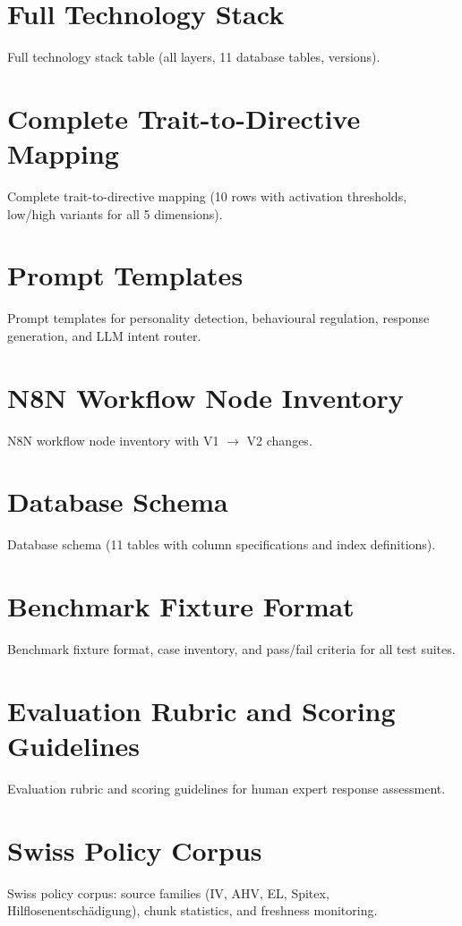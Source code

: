 \documentclass[10pt,a4paper]{report}
\begin{document}



\appendix
\chapter{Full Technology Stack}
Full technology stack table (all layers, 11 database tables, versions).

\chapter{Complete Trait-to-Directive Mapping}
Complete trait-to-directive mapping (10 rows with activation thresholds, low/high variants for all 5 dimensions).

\chapter{Prompt Templates}
Prompt templates for personality detection, behavioural regulation, response generation, and LLM intent router.

\chapter{N8N Workflow Node Inventory}
N8N workflow node inventory with V1 $\rightarrow$ V2 changes.

\chapter{Database Schema}
Database schema (11 tables with column specifications and index definitions).

\chapter{Benchmark Fixture Format}
Benchmark fixture format, case inventory, and pass/fail criteria for all test suites.

\chapter{Evaluation Rubric and Scoring Guidelines}
Evaluation rubric and scoring guidelines for human expert response assessment.

\chapter{Swiss Policy Corpus}
Swiss policy corpus: source families (IV, AHV, EL, Spitex, Hilflosenentschädigung), chunk statistics, and freshness monitoring.
\end{document}
